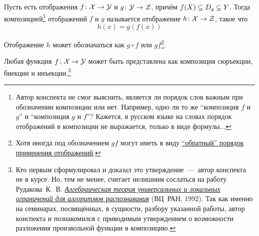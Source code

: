 \documentclass[a4paper,12pt]{article}
\begin{document}
  \begin{definition}
    Пусть есть отображения $f\colon \mathcal X \hm\to \mathcal Y$ и $g\colon \mathcal Y \hm\to \mathcal Z$, причём $f(X) \hm\subseteq D_g \hm\subseteq Y$.
    Тогда композицией\footnote{Автор конспекта не смог выяснить, является ли порядок слов важным при обозначении композиции или нет. Например, одно ли то же ``композиция $f$ и $g$'' и ``композиция $g$ и $f$''? Кажется, в русском языке на словах порядок отображений в композиции не выражается, только в виде формулы...} отображений $f$ и $g$ называется отображение $h\colon \mathcal X \hm\to \mathcal Z$, такое что
    \[
      h(x) = g(f(x))
    \]
    
    Отображение $h$ может обозначаться как $g\circ f$ или $gf$\footnote{Хотя иногда под обозначением $gf$ могут иметь в виду \href{https://en.wikipedia.org/wiki/Function\_composition\#Alternative\_notations}{``обратный'' порядок применения отображений}.}.
  \end{definition}

  \begin{theorem}
    Любая функция $f\colon \mathcal X \hm\to \mathcal Y$ может быть представлена как композиция сюръекции, биекции и инъекции.\footnote{Кто первым сформулировал и доказал это утверждение~---~автор конспекта не в курсе. Но, тем не менее, считает нелишним сослаться на работу Рудакова~К.~В. \href{https://yourcmc.ru/wiki/images/1/15/RudakovDocDisser.pdf}{\emph{Алгебраическая теория универсальных и локальных ограничений для алгоритмов распознавания}} (ВЦ~РАН, 1992). Так как именно на семинарах, посвящённых, в сущности, разбору указанной работы, автор конспекта и познакомился с приводимым утверждением о возможности разложения произвольной функции в композицию.}
  \end{theorem}
  
\end{document}

